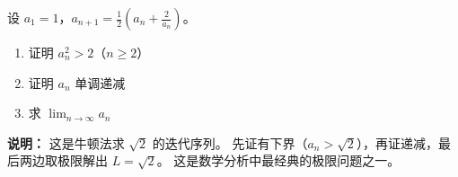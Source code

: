 
\begin{exercise}[7]
设 \(a_1 = 1\)，\(a_{n+1} = \frac{1}{2}\left(a_n + \frac{2}{a_n}\right)\)。
\begin{enumerate}
  \item[(1)] 证明 \(a_n^2 > 2\)（\(n \ge 2\)）
  \item[(2)] 证明 \(a_n\) 单调递减
  \item[(3)] 求 \(\displaystyle \lim_{n\to\infty} a_n\)
\end{enumerate}

\textbf{说明：} 这是牛顿法求 \(\sqrt{2}\) 的迭代序列。
先证有下界（\(a_n > \sqrt{2}\)），再证递减，最后两边取极限解出 \(L = \sqrt{2}\)。
这是数学分析中最经典的极限问题之一。
\end{exercise}
